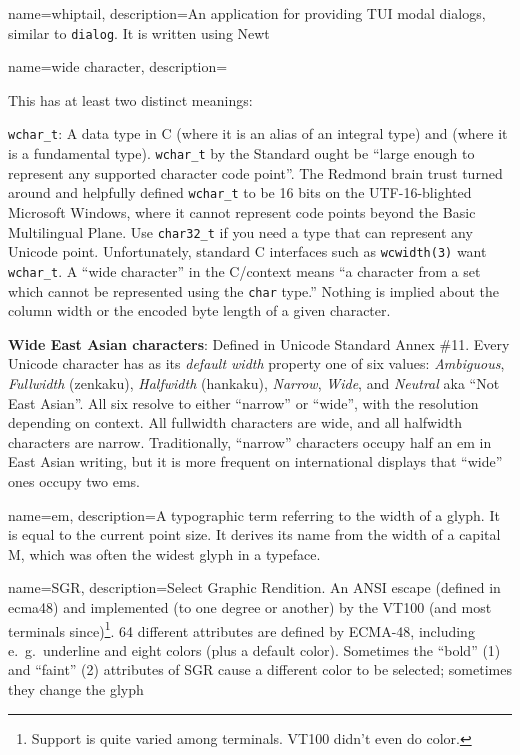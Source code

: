 {
  name={whiptail},
description={An application for providing TUI modal dialogs, similar to \texttt{dialog}. It is written using Newt}
}

{
  name={wide character},
  description={This has at least two distinct meanings:
\begin{denseitemize}
\item \texttt{wchar\_t}: A data type in C (where it is an alias of an integral
  type) and \CC (where it is a fundamental type). \texttt{wchar\_t} by the
  Standard ought be ``large enough to represent any supported character code
  point''. The Redmond brain trust turned around and helpfully defined
  \texttt{wchar\_t} to be 16 bits on the UTF-16-blighted Microsoft Windows,
  where it cannot represent code points beyond the Basic Multilingual Plane.
  Use \texttt{char32\_t} if you need a type that can represent any Unicode
  point. Unfortunately, standard C interfaces such as \texttt{wcwidth(3)} want
  \texttt{wchar\_t}. A ``wide character'' in the C/\CC context means ``a character
  from a set which cannot be represented using the \texttt{char} type.'' Nothing is implied
  about the column width or the encoded byte length of a given character.
\item \textbf{Wide East Asian characters}: Defined in Unicode Standard Annex \#11.
    Every Unicode character has as its \textit{default width} property one of
    six values: \textit{Ambiguous}, \textit{Fullwidth} (zenkaku),
    \textit{Halfwidth} (hankaku), \textit{Narrow}, \textit{Wide}, and \textit{Neutral}
    aka ``Not East Asian''. All six resolve to either ``narrow'' or ``wide'', with
    the resolution depending on context. All fullwidth characters are wide, and
    all halfwidth characters are narrow. Traditionally, ``narrow'' characters
    occupy half an \gls{em} in East Asian writing, but it is more frequent on
    international displays that ``wide'' ones occupy two ems.
\end{denseitemize}}
}

{
  name={em},
  description={A typographic term referring to the width of a glyph. It is
    equal to the current point size. It derives its name from the width of a
    capital M, which was often the widest glyph in a typeface.}
}

{
  name={SGR},
    description={Select Graphic Rendition. An ANSI escape (defined in
      \Gls{ecma48}) and implemented (to one degree or another) by the
      VT100\cite{vt100} (and most terminals since)\footnote{Support is quite varied
      among terminals. VT100 didn't even do color.}. 64 different
      attributes are defined by ECMA-48, including e.\ g.\ underline and
      eight colors (plus a default color). Sometimes the ``bold'' (1) and
      ``faint'' (2) attributes of SGR cause a different color to be selected;
      sometimes they change the glyph}
}

